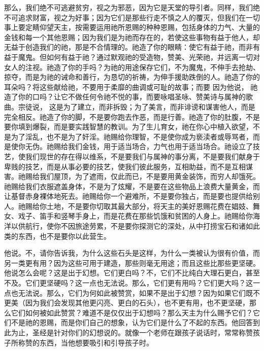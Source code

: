 那么，我们绝不可逃避贫穷，视之为邪恶，因为它是天堂的导引者。同样，我们绝不可追求财富，视之为好事；因为它们是那些行走不慎之人的覆灭，但我们在一切事上要定睛仰望天主，按需要运用祂所恩赐的种种恩赐，包括身体的力气、大量的金钱和每一个其他恩赐；因为我们是为祂而存在的，若使这些事物有益于他人，却无益于创造我们的祂，那是不合情理的。祂造了你的眼睛：使它有益于祂，而非有益于魔鬼。但如何有益于祂？通过默观祂的受造物，赞美、光荣祂，并远离一切对女人的注视。祂造了你的手吗？为祂的用途保存它们，不为魔鬼，不伸手去抢劫、掠夺，而是为祂的诫命和善行，为恳切的祈祷，为伸手援助跌倒的人。祂造了你的耳朵吗？将这些献给祂，不要用于柔靡的曲调或可耻的故事；而要 因为他说， 祂造了你的口吗？让它不做任何令祂不悦的事，而要咏唱圣咏、赞美诗与属神的歌曲。宗徒说， 这是为了建立，而非拆毁；为了美言，而非诽谤和谋害他人，而是完全相反。祂造了你的脚，不是要你跑去作恶，而是行善。祂造了你的肚腹，不是要你填到爆裂，而是要实践智慧的教训。为了生儿育女，祂在你心中植入欲望，不是为了淫乱，也不是为了奸淫。祂赐给你理智，不是使你成为亵渎者或辱骂者，而是使你无伪。祂赐给我们金钱，用于适当场合，力气也用于适当场合。祂设立了技艺，使我们现世的存在得以维系，不是要我们与属神的事分离，不是要我们献身于卑贱的技艺，而是从事必要的技艺，使我们彼此服务，互相助益，而不是互相谋害。祂赐给我们屋顶，为了遮雨，仅此而已，不是要用黄金装饰，而穷人却饿死。祂赐给我们衣服遮盖身体，不是为了炫耀，不是要在这些物品上浪费大量黄金，而让基督赤身裸体地死去。祂赐给你一个避难所，不是要你独占，而是要也提供给别人。祂赐给你土地，不是要你切取其最大部分，将天主的美好恩赐花费在娼妓、舞女、戏子、笛手和竖琴手身上，而是花费在那些饥饿和贫困的人身上。祂赐给你海洋以供航行，使你不因旅途劳累，不是要你探测它的深处，从中打捞宝石和诸如此类的东西，也不是要你以此营生。\par

他说。不，请你告诉我，为什么这些石头是这样，为什么一类被认为很有价值，而另一类更有用？因为这些可用于建造，那些则毫无用途；而且这些比那些更坚硬。他说怎么会呢？这是出于幻想。它们更白吗？不，它们不比纯白大理石更白，甚至不及。它们更坚硬吗？这一点也无法说。那么，它们更有用吗？它们更大吗？这一点也无法说。那么，它们为何如此被赞赏，如果不是出于幻想？因为如果它们既不更美（因为我们会发现其他更闪亮、更白的石头），也不更有用，也不更坚硬，那么它们如何被如此赞赏？难道不是仅仅出于幻想吗？那么天主为什么赐予它们？它们不是祂的恩赐，而是你们自己的想象，认为它们是什么了不起的东西。他回答到此为止，圣经是针对你们的幻想说的。就像一个老师在跟孩子说话时，常常称赞孩子所称赞的东西，当他想要吸引和引导孩子时。\par

